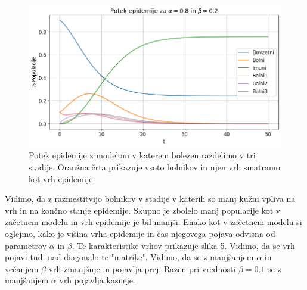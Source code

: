 \documentclass[slovene,11pt,a4paper]{article}
\begin{document}
\begin{figure}[h!]
\centering
\includegraphics[width=13.5cm]{stadiji1.png}
\caption{Potek epidemije z modelom v katerem bolezen razdelimo v tri stadije. Oranžna črta prikazuje vsoto bolnikov in njen vrh smatramo kot vrh epidemije.}
\end{figure}

Vidimo, da z razmestitvijo bolnikov v stadije v katerih so manj kužni vpliva na vrh in na končno stanje epidemije. Skupno je zbolelo manj populacije kot v začetnem modelu in vrh epidemije je bil manjši. Enako kot v začetnem modelu si oglejmo, kako je višina vrha epidemije in čas njegovega pojava odvisna od parametrov $\alpha$ in $\beta$. Te karakteristike vrhov prikazuje slika 5. Vidimo, da se vrh pojavi tudi nad diagonalo te "matrike". Vidimo, da se z manjšanjem $\alpha$ in večanjem $\beta$ vrh zmanjšuje in pojavlja prej. Razen pri vrednosti $\beta = 0.1$ se z manjšanjem $\alpha$ vrh pojavlja kasneje.

\newpage
\end{document}
